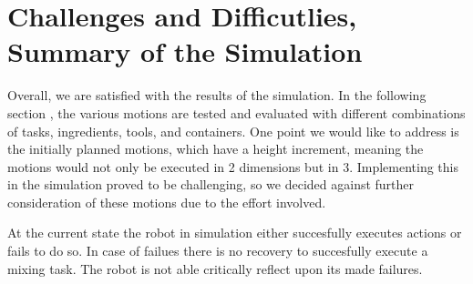 \section{Challenges and Difficutlies, Summary of the Simulation}
Overall, we are satisfied with the results of the simulation. In the following section , the various motions are tested and evaluated with different combinations of tasks, ingredients, tools, and containers. One point we would like to address is the initially planned motions, which have a height increment, meaning the motions would not only be executed in 2 dimensions but in 3. Implementing this in the simulation proved to be challenging, so we decided against further consideration of these motions due to the effort involved.

At the current state the robot in simulation either succesfully executes actions or fails to do so.
In case of failues there is no recovery to succesfully execute a mixing task. The robot is not able critically
reflect upon its made failures.
